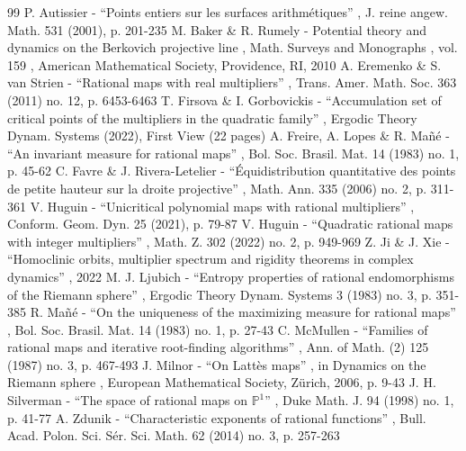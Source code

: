 \documentclass[11pt]{article}
\theoremstyle{plain}
\theoremstyle{definition}
\theoremstyle{remark}
\begin{document}
\begin{thebibliography}{99}
 P. Autissier - “Points entiers sur les surfaces arithmétiques” , J. reine angew. Math. 531 (2001), p. 201-235
 M. Baker \& R. Rumely - Potential theory and dynamics on the Berkovich projective line , Math. Surveys and Monographs , vol. 159 , American Mathematical Society, Providence, RI, 2010
 A. Eremenko \& S. van Strien - “Rational maps with real multipliers” , Trans. Amer. Math. Soc. 363 (2011) no. 12, p. 6453-6463
 T. Firsova \& I. Gorbovickis - “Accumulation set of critical points of the multipliers in the quadratic family” , Ergodic Theory Dynam. Systems (2022), First View (22 pages)
 A. Freire, A. Lopes \& R. Mañé - “An invariant measure for rational maps” , Bol. Soc. Brasil. Mat. 14 (1983) no. 1, p. 45-62
 C. Favre \& J. Rivera-Letelier - “Équidistribution quantitative des points de petite hauteur sur la droite projective” , Math. Ann. 335 (2006) no. 2, p. 311-361
 V. Huguin - “Unicritical polynomial maps with rational multipliers” , Conform. Geom. Dyn. 25 (2021), p. 79-87
 V. Huguin - “Quadratic rational maps with integer multipliers” , Math. Z. 302 (2022) no. 2, p. 949-969
 Z. Ji \& J. Xie - “Homoclinic orbits, multiplier spectrum and rigidity theorems in complex dynamics” , 2022
 M. J. Ljubich - “Entropy properties of rational endomorphisms of the Riemann sphere” , Ergodic Theory Dynam. Systems 3 (1983) no. 3, p. 351-385
 R. Mañé - “On the uniqueness of the maximizing measure for rational maps” , Bol. Soc. Brasil. Mat. 14 (1983) no. 1, p. 27-43
 C. McMullen - “Families of rational maps and iterative root-finding algorithms” , Ann. of Math. (2) 125 (1987) no. 3, p. 467-493
 J. Milnor - “On Lattès maps” , in Dynamics on the Riemann sphere , European Mathematical Society, Zürich, 2006, p. 9-43
 J. H. Silverman - “The space of rational maps on $\mathbb{P}^{1}$” , Duke Math. J. 94 (1998) no. 1, p. 41-77
 A. Zdunik - “Characteristic exponents of rational functions” , Bull. Acad. Polon. Sci. Sér. Sci. Math. 62 (2014) no. 3, p. 257-263
\end{thebibliography}
\end{document}
